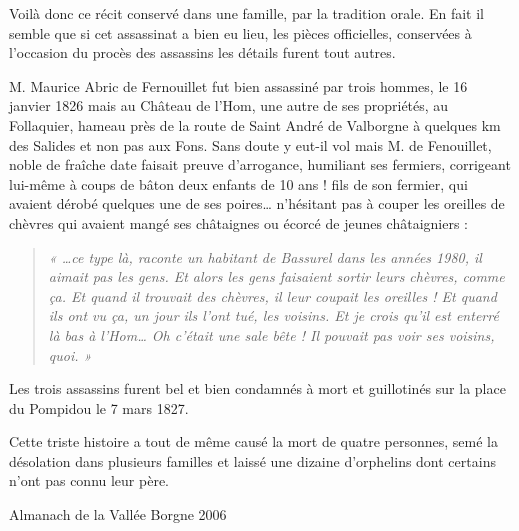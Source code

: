 
Voilà donc ce récit conservé dans une famille, par la tradition orale. En fait il semble que si
cet assassinat a bien eu lieu, les pièces officielles, conservées à l’occasion du procès des
assassins les détails furent tout autres.

M. Maurice Abric de Fernouillet fut bien assassiné par trois hommes, le 16 janvier 1826 mais
au Château de l’Hom, une autre de ses propriétés, au Follaquier, hameau près de la route de
Saint André de Valborgne à quelques km des Salides et non pas aux Fons.
Sans doute y eut-il vol mais M. de Fenouillet, noble de fraîche date faisait preuve
d’arrogance, humiliant ses fermiers, corrigeant lui-même à coups de bâton deux enfants de 10
ans ! fils de son fermier, qui avaient dérobé quelques une de ses poires… n’hésitant pas à
couper les oreilles de chèvres qui avaient mangé ses châtaignes ou écorcé de jeunes
châtaigniers :

\begin{quote}
\textit{« …ce type là, raconte un habitant de Bassurel dans les années 1980, il aimait pas les gens.
Et alors les gens faisaient sortir leurs chèvres, comme ça. Et quand il trouvait des chèvres, il
leur coupait les oreilles ! Et quand ils ont vu ça, un jour ils l’ont tué, les voisins. Et je crois
qu’il est enterré là bas à l’Hom… Oh c’était une sale bête ! Il pouvait pas voir ses voisins,
quoi. »}
\end{quote}

Les trois assassins furent bel et bien condamnés à mort et guillotinés sur la place du
Pompidou le 7 mars 1827.

Cette triste histoire a tout de même causé la mort de quatre personnes, semé la désolation dans
plusieurs familles et laissé une dizaine d’orphelins dont certains n’ont pas connu leur père.

\begin{flushright}
Almanach de la Vallée Borgne 2006
\end{flushright}

